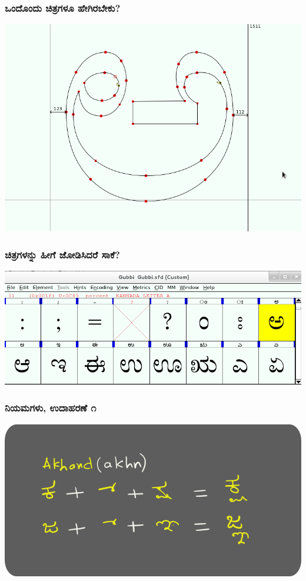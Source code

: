 \documentclass[16pt]{beamer}
\begin{document}
\begin{spacing}{1.6}
  \begin{frame}
    \frametitle{ಒಂದೊಂದು ಚಿತ್ರಗಳೂ ಹೇಗಿರಬೇಕು?}
    \includegraphics[width=\textwidth]{images/aglyph.png}
  \end{frame}

  \begin{frame}
    \frametitle{ಚಿತ್ರಗಳನ್ನು ಹೀಗೆ ಜೋಡಿಸಿದರೆ ಸಾಕೆ?}
    \includegraphics[width=\textwidth]{images/glyphs.png}
  \end{frame}

  \begin{frame}
    \frametitle{ನಿಯಮಗಳು, ಉದಾಹರಣೆ ೧}
    \includegraphics[width=\textwidth]{images/akhn-bg.png}
  \end{frame}


\end{spacing}
\end{document}
